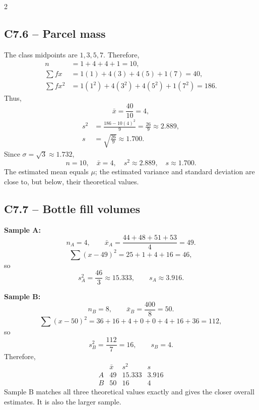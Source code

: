 \begin{multicols}{2}

\subsection*{C7.6 -- Parcel mass}
\label{subsec:c7-solution-parcels}

The class midpoints are $1,3,5,7$. Therefore,
\[
\begin{aligned}
	n&=1+4+4+1=10,\\
	\sum fx&=1(1)+4(3)+4(5)+1(7)=40,\\
	\sum fx^2&=1(1^2)+4(3^2)+4(5^2)+1(7^2)=186.
\end{aligned}
\]
Thus,
\[
	\bar{x}=\frac{40}{10}=4,
\]
\[
	\begin{aligned}
	s^2&=\frac{186-10(4)^2}{9}=\frac{26}{9}\approx2.889,\\
	s&=\sqrt{\frac{26}{9}}\approx1.700.
	\end{aligned}
\]
Since $\sigma=\sqrt3\approx1.732$,
\[
\boxed{n=10,\quad\bar{x}=4,\quad s^2\approx2.889,
	\quad s\approx1.700.}
\]
The estimated mean equals $\mu$; the estimated variance and standard
deviation are close to, but below, their theoretical values.


\subsection*{C7.7 -- Bottle fill volumes}
\label{subsec:c7-solution-fill-volumes}

\textbf{Sample A:}
\[
	n_A=4,\qquad
	\bar{x}_A=\frac{44+48+51+53}{4}=49.
\]
\[
	\sum(x-49)^2=25+1+4+16=46,
\]
so
\[
	s_A^2=\frac{46}{3}\approx15.333,\qquad
	s_A\approx3.916.
\]

\textbf{Sample B:}
\[
	n_B=8,\qquad
	\bar{x}_B=\frac{400}{8}=50.
\]
\[
	\sum(x-50)^2=36+16+4+0+0+4+16+36=112,
\]
so
\[
	s_B^2=\frac{112}{7}=16,\qquad s_B=4.
\]
Therefore,
\[
\boxed{
\begin{array}{c|ccc}
	&\bar{x}&s^2&s\\ \hline
	A&49&15.333&3.916\\
	B&50&16&4
\end{array}}
\]
Sample B matches all three theoretical values exactly and gives the closer
overall estimates. It is also the larger sample.


\end{multicols}
